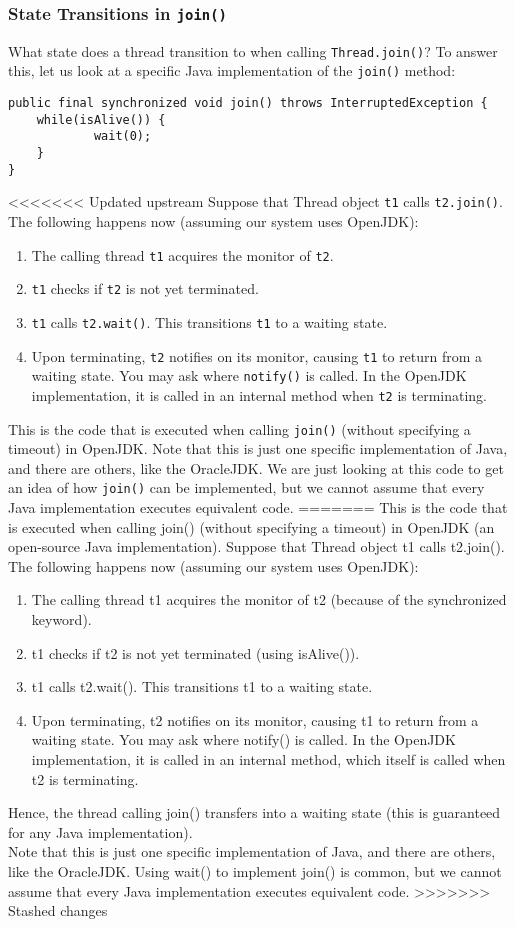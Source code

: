 \documentclass[main.tex]{subfiles}
\begin{document}
\subsubsection{State Transitions in \texttt{join()}}
What state does a thread transition to when calling \texttt{Thread.join()}? To answer this, let us look at a specific Java implementation of the \texttt{join()} method:
\begin{verbatim}
public final synchronized void join() throws InterruptedException {
    while(isAlive()) {
            wait(0);
    }
}
\end{verbatim}
<<<<<<< Updated upstream
Suppose that Thread object \texttt{t1} calls \texttt{t2.join()}. The following happens now (assuming our system uses OpenJDK):
\begin{enumerate}
    \item The calling thread \texttt{t1} acquires the monitor of \texttt{t2}.
    \item \texttt{t1} checks if \texttt{t2} is not yet terminated.
    \item \texttt{t1} calls \texttt{t2.wait()}. This transitions \texttt{t1} to a waiting state.
    \item Upon terminating, \texttt{t2} notifies on its monitor, causing \texttt{t1} to return from a waiting state. You may ask where \texttt{notify()} is called. In the OpenJDK implementation, it is called in an internal method when \texttt{t2} is terminating.
\end{enumerate}
This is the code that is executed when calling \texttt{join()} (without specifying a timeout) in OpenJDK. Note that this is just one specific implementation of Java, and there are others, like the OracleJDK. We are just looking at this code to get an idea of how \texttt{join()} can be implemented, but we cannot assume that every Java implementation executes equivalent code.
=======
This is the code that is executed when calling join() (without specifying a timeout) in OpenJDK (an open-source Java implementation). Suppose that Thread object t1 calls t2.join(). The following happens now (assuming our system uses OpenJDK):
\begin{enumerate}
  \item The calling thread t1 acquires the monitor of t2 (because of the synchronized keyword).
  \item t1 checks if t2 is not yet terminated (using isAlive()).
  \item t1 calls t2.wait(). This transitions t1 to a waiting state.
  \item Upon terminating, t2 notifies on its monitor, causing t1 to return from a waiting state. You may ask where notify() is called. In the OpenJDK implementation, it is called in an internal method, which itself is called when t2 is terminating.
\end{enumerate}
Hence, the thread calling join() transfers into a waiting state (this is guaranteed for any Java implementation).\\
Note that this is just one specific implementation of Java, and there are others, like the OracleJDK. Using wait() to implement join() is common, but we cannot assume that every Java implementation executes equivalent code.
>>>>>>> Stashed changes
\end{document}
